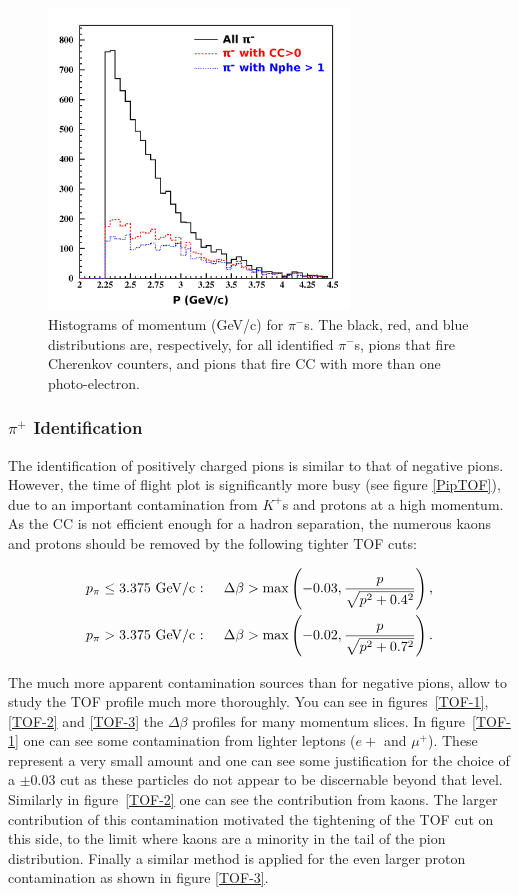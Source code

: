 \begin{figure}[tbp]
\centering
\includegraphics[width=8cm] {chap5-fig/fig06.png} 
\caption {Histograms of momentum (GeV/c) for $\pi^-$s. The black, red, and blue distributions are, respectively, for all identified $\pi^-$s, pions that fire Cherenkov counters, and pions that fire CC with more than one photo-electron.}
\label{PionCC}
\end{figure}

\subsubsection{$\pi^+$ Identification}

The identification of positively charged pions is similar to that of negative 
pions. However, the time of flight plot is significantly more busy (see figure 
\ref{PipTOF}), due to an important contamination from $K^+$s and protons at a
high momentum. As the CC is not efficient enough for a hadron separation, the 
numerous kaons and protons should be removed by the following tighter TOF cuts:

\begin{subequations}\label{TOF-Pip}
\begin{align}
    p_\pi &\leq 3.375 \text{ GeV/c : }
  & \Delta \beta &> \max\left(-0.03,{p \over\sqrt{p^2+0.4^2}}\right), \\ 
    p_\pi &> 3.375    \text{ GeV/c : }
  & \Delta \beta &> \max\left(-0.02,{p \over\sqrt{p^2+0.7^2}}\right).
\end{align}
\end{subequations}

The much more apparent contamination sources than for negative pions, allow to study 
the TOF profile much more thoroughly. You can see in figures~\ref{TOF-1}, \ref{TOF-2} and 
\ref{TOF-3} the $\Delta \beta$ profiles for many momentum slices. In figure~\ref{TOF-1}
one can see some contamination from lighter leptons ($e+$ and $\mu^+$). These represent
a very small amount and one can see some justification for the choice of a $\pm 0.03$
cut as these particles do not appear to be discernable beyond that level. Similarly
in figure~\ref{TOF-2} one can see the contribution from kaons. The larger contribution
of this contamination motivated the tightening of the TOF cut on this side, to the limit
where kaons are a minority in the tail of the pion distribution. Finally a similar 
method is applied for the even larger proton contamination as shown in figure \ref{TOF-3}.

